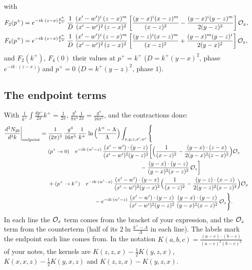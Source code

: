 \documentclass[10pt]{article}
\begin{document}
with
\begin{align}
F_2(p^+)&=e^{-ik\cdot(z-x)\frac{p^{+}}{k^{+}}}\,\frac{1}{D}\,\frac{(x'-w')^{i}\,(z-x)^{m}}{(x'-w')^{2}\,(z-x)^{2}}\left[\frac{(y-x)^{i}(x-z)^{m}}{(x-z)^{2}}-\frac{(y-x)^{i}(y-z)^{m}}{2(y-z)^{2}}\right]{\cal O}_x,\notag\\
F_4(p^+)&=e^{-ik\cdot(z-x)\frac{p^{+}}{k^{+}}}\,\frac{1}{D}\,\frac{(x'-w')^{i}\,(z-x)^{m}}{(x'-w')^{2}\,(z-x)^{2}}\left[\frac{(y-z)^{i}(x-z)^{m}}{(x-z)^{2}}+\frac{(y-x)^{m}(y-z)^{i}}{2(y-x)^{2}}\right]{\cal O}_x,
\end{align}
and $F_2(k^+)$, $F_4(0)$ their values at $p^+=k^+$ ($D=k^+(y-x)^2$, phase $e^{-ik\cdot(z-x)}$) and $p^+=0$ ($D=k^+(y-z)^2$, phase $1$).

\subsection{The endpoint terms}
With $\frac{1}{k^+}\int\frac{dp^+}{2\pi}k^+=\frac{1}{2\pi}$, $\frac{g^4}{8\pi^4}\frac{1}{2\pi}=\frac{g^4}{16\pi^5}$, and the contractions done:
\begin{align}
\frac{d^{3}N_{2b}}{d^{3}k}\bigg|_{\rm endpoint}={}&\frac{1}{(2\pi)^{3}}\,\frac{g^{4}}{16\pi^{5}}\,\frac{1}{k^{+}}\,\ln\Big(\frac{k^+-\Lambda}{\Lambda}\Big)\int_{x,y,z,x',w'}\Bigg\{\notag\\
&\text{\small($p^+\to0$)}\quad e^{-ik\cdot(w'-z)}\,\frac{(x'-w')\cdot(y-z)}{(x'-w')^{2}(y-z)^{2}}\bigg[\Big(\frac{1}{(x-z)^{2}}-\frac{(y-x)\cdot(z-x)}{2(y-x)^{2}(z-x)^{2}}\Big){\cal O}_x\notag\\
&\hspace{16em}-\frac{(y-x)\cdot(y-z)}{(y-x)^{2}(x-z)^{2}}\,{\cal O}_z\bigg]\notag\\
&+\text{\small($p^+\to k^+$)}\quad e^{-ik\cdot(w'-x)}\,\frac{(x'-w')\cdot(y-x)}{(x'-w')^{2}(y-x)^{2}}\Big(\frac{1}{(x-z)^{2}}-\frac{(y-z)\cdot(x-z)}{2(y-z)^{2}(x-z)^{2}}\Big){\cal O}_x\notag\\
&\hspace{8em}-e^{-ik\cdot(w'-z)}\,\frac{(x'-w')\cdot(y-z)}{(x'-w')^{2}(y-z)^{2}}\,\frac{(y-x)\cdot(y-z)}{(y-x)^{2}(x-z)^{2}}\,{\cal O}_z\Bigg\}.
\label{eq:end}
\end{align}
In each line the ${\cal O}_x$ term comes from the bracket of your expression, and the ${\cal O}_z$ term from the counterterm (half of its $2\ln\frac{k^+-\Lambda}{\Lambda}$ in each line). The labels mark the endpoint each line comes from. In the notation $K(a,b,c)=\frac{(a-c)\cdot(b-c)}{(a-c)^2(b-c)^2}$ of your notes, the kernels are $K(z,z,x)-\tfrac12K(y,z,x)$, $K(x,x,z)-\tfrac12K(y,x,z)$ and $K(z,z,x)-K(y,z,x)$.
\end{document}
